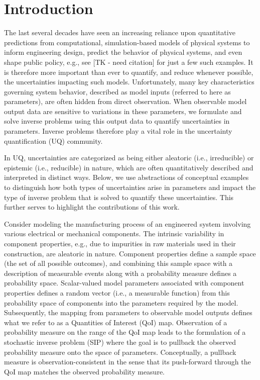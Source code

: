 \section{Introduction}
\label{sec:Intro}

The last several decades have seen an increasing reliance upon quantitative predictions from computational, simulation-based models of physical systems to inform engineering design, predict the behavior of physical systems, and even shape public policy, e.g., see [TK - need citation] for just a few such examples.
It is therefore more important than ever to quantify, and reduce whenever possible, the uncertainties impacting such models.
Unfortunately, many key characteristics governing system behavior, described as model inputs (referred to here as parameters), are often hidden from direct observation.
When observable model output data are sensitive to variations in these parameters, we formulate and solve inverse problems using this output data to quantify uncertainties in parameters.
Inverse problems therefore play a vital role in the uncertainty quantification (UQ) community.

In UQ, uncertainties are categorized as being either aleatoric (i.e., irreducible) or epistemic (i.e., reducible) in nature, which are often quantitatively described and interpreted in distinct ways.
Below, we use abstractions of conceptual examples to distinguish how both types of uncertainties arise in parameters and impact the type of inverse problem that is solved to quantify these uncertainties.
This further serves to highlight the contributions of this work.

Consider modeling the manufacturing process of an engineered system involving various electrical or mechanical components.
The intrinsic variability in component properties, e.g., due to impurities in raw materials used in their construction, are aleatoric in nature.
Component properties define a sample space (the set of all possible outcomes), and combining this sample space with a description of measurable events along with a probability measure defines a probability space.
Scalar-valued model parameters associated with component properties defines a random vector (i.e., a measurable function) from this probability space of components into the parameters required by the model.
Subsequently, the mapping from parameters to observable model outputs defines what we refer to as a Quantities of Interest (QoI) map.
Observation of a probability measure on the range of the QoI map leads to the formulation of a stochastic inverse problem (SIP) where the goal is to pullback the observed probability measure onto the space of parameters.
Conceptually, a pullback measure is observation-consistent in the sense that its push-forward through the QoI map matches the observed probability measure.

